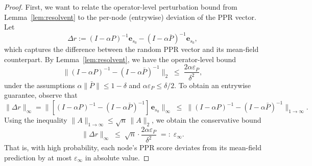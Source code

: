 \begin{proof}
\label{proof_theorem}
First, we want to relate the operator-level perturbation bound from Lemma~\ref{lem:resolvent} to the per-node (entrywise) deviation of the PPR vector.
Let
\[
\Delta r := (I - \alpha P)^{-1}\mathbf{e}_{s_0} - (I - \alpha \bar P)^{-1}\mathbf{e}_{s_0},
\]
which captures the difference between the random PPR vector and its mean-field counterpart.
By Lemma~\ref{lem:resolvent}, we have the operator-level bound
\[
\|(I - \alpha P)^{-1} - (I - \alpha \bar P)^{-1}\|_2 \;\le\; \frac{2\alpha\varepsilon_P}{\delta^2},
\]
under the assumptions $\alpha\|\bar P\| \le 1-\delta$ and $\alpha\varepsilon_P \le \delta/2$. To obtain an entrywise guarantee, observe that
\[
\|\Delta r\|_\infty
= \|[(I - \alpha P)^{-1} - (I - \alpha \bar P)^{-1}]\,\mathbf{e}_{s_0}\|_\infty
\;\le\;
\|(I - \alpha P)^{-1} - (I - \alpha \bar P)^{-1}\|_{1\to\infty}.
\]
Using the inequality $\|A\|_{1\to\infty} \le \sqrt{n}\,\|A\|_2$,
we obtain the conservative bound
\[
\|\Delta r\|_\infty
\;\le\; \sqrt{n}\cdot\frac{2\alpha\varepsilon_P}{\delta^2}
\;=:\; \varepsilon_{\infty}.
\]
That is, with high probability, each node's PPR score deviates from its mean-field prediction
by at most $\varepsilon_{\infty}$ in absolute value.


\end{proof}
